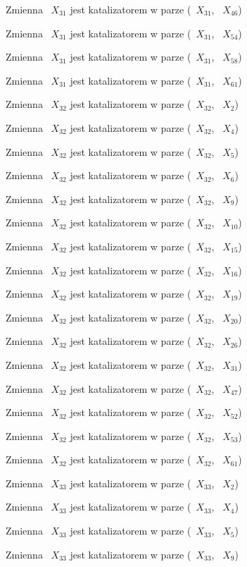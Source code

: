 \documentclass{article}
\begin{document}
Zmienna ~$X_{31}$ jest katalizatorem w parze (~$X_{31}$, ~$X_{46}$)

Zmienna ~$X_{31}$ jest katalizatorem w parze (~$X_{31}$, ~$X_{54}$)

Zmienna ~$X_{31}$ jest katalizatorem w parze (~$X_{31}$, ~$X_{58}$)

Zmienna ~$X_{31}$ jest katalizatorem w parze (~$X_{31}$, ~$X_{61}$)

Zmienna ~$X_{32}$ jest katalizatorem w parze (~$X_{32}$, ~$X_{2}$)

Zmienna ~$X_{32}$ jest katalizatorem w parze (~$X_{32}$, ~$X_{4}$)

Zmienna ~$X_{32}$ jest katalizatorem w parze (~$X_{32}$, ~$X_{5}$)

Zmienna ~$X_{32}$ jest katalizatorem w parze (~$X_{32}$, ~$X_{6}$)

Zmienna ~$X_{32}$ jest katalizatorem w parze (~$X_{32}$, ~$X_{9}$)

Zmienna ~$X_{32}$ jest katalizatorem w parze (~$X_{32}$, ~$X_{10}$)

Zmienna ~$X_{32}$ jest katalizatorem w parze (~$X_{32}$, ~$X_{15}$)

Zmienna ~$X_{32}$ jest katalizatorem w parze (~$X_{32}$, ~$X_{16}$)

Zmienna ~$X_{32}$ jest katalizatorem w parze (~$X_{32}$, ~$X_{19}$)

Zmienna ~$X_{32}$ jest katalizatorem w parze (~$X_{32}$, ~$X_{20}$)

Zmienna ~$X_{32}$ jest katalizatorem w parze (~$X_{32}$, ~$X_{26}$)

Zmienna ~$X_{32}$ jest katalizatorem w parze (~$X_{32}$, ~$X_{31}$)

Zmienna ~$X_{32}$ jest katalizatorem w parze (~$X_{32}$, ~$X_{47}$)

Zmienna ~$X_{32}$ jest katalizatorem w parze (~$X_{32}$, ~$X_{52}$)

Zmienna ~$X_{32}$ jest katalizatorem w parze (~$X_{32}$, ~$X_{53}$)

Zmienna ~$X_{32}$ jest katalizatorem w parze (~$X_{32}$, ~$X_{61}$)

Zmienna ~$X_{33}$ jest katalizatorem w parze (~$X_{33}$, ~$X_{2}$)

Zmienna ~$X_{33}$ jest katalizatorem w parze (~$X_{33}$, ~$X_{4}$)

Zmienna ~$X_{33}$ jest katalizatorem w parze (~$X_{33}$, ~$X_{5}$)

Zmienna ~$X_{33}$ jest katalizatorem w parze (~$X_{33}$, ~$X_{9}$)
\end{document}
